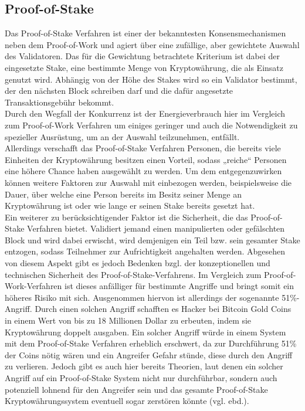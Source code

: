 \documentclass[12pt]{article}
\begin{document}
\subsection{Proof-of-Stake}
Das Proof-of-Stake Verfahren ist einer der bekanntesten Konsensmechanismen neben dem Proof-of-Work und agiert über eine zufällige, aber gewichtete Auswahl des Validatoren. Das für die Gewichtung betrachtete Kriterium ist dabei der eingesetzte Stake, eine bestimmte Menge von Kryptowährung, die als Einsatz genutzt wird. Abhängig von der Höhe des Stakes wird so ein Validator bestimmt, der den nächsten Block schreiben darf und die dafür angesetzte Transaktionsgebühr bekommt.\\
Durch den Wegfall der Konkurrenz ist der Energieverbrauch hier im Vergleich zum Proof-of-Work Verfahren um einiges geringer und auch die Notwendigkeit zu spezieller Ausrüstung, um an der Auswahl teilzunehmen, entfällt.\\
Allerdings verschafft das Proof-of-Stake Verfahren Personen, die bereits viele Einheiten der Kryptowährung besitzen einen Vorteil, sodass „reiche“ Personen eine höhere Chance haben ausgewählt zu werden. Um dem entgegenzuwirken können weitere Faktoren zur Auswahl mit einbezogen werden, beispielsweise die Dauer, über welche eine Person bereits im Besitz seiner Menge an Kryptowährung ist oder wie lange er seinen Stake bereits gesetzt hat.\\
Ein weiterer zu berücksichtigender Faktor ist die Sicherheit, die das Proof-of-Stake Verfahren bietet. Validiert jemand einen manipulierten oder gefälschten Block und wird dabei erwischt, wird demjenigen ein Teil bzw. sein gesamter Stake entzogen, sodass Teilnehmer zur Aufrichtigkeit angehalten werden. Abgesehen von diesem Aspekt gibt es jedoch Bedenken bzgl. der konzeptionellen und technischen Sicherheit des Proof-of-Stake-Verfahrens. Im Vergleich zum Proof-of-Work-Verfahren ist dieses anfälliger für bestimmte Angriffe und bringt somit ein höheres Risiko mit sich. Ausgenommen hiervon ist allerdings der sogenannte 51\%-Angriff. Durch einen solchen Angriff schafften es Hacker bei Bitcoin Gold Coins in einem Wert von bis zu 18 Millionen Dollar zu erbeuten, indem sie Kryptowährung doppelt ausgaben. Ein solcher Angriff würde in einem System mit dem Proof-of-Stake Verfahren erheblich erschwert, da zur Durchführung 51\% der Coins nötig wären und ein Angreifer Gefahr stünde, diese durch den Angriff zu verlieren. Jedoch gibt es auch hier bereits Theorien, laut denen ein solcher Angriff auf ein Proof-of-Stake System nicht nur durchführbar, sondern auch potenziell lohnend für den Angreifer sein und das gesamte Proof-of-Stake Kryptowährungssystem eventuell sogar zerstören könnte (vgl. ebd.).
\end{document}
